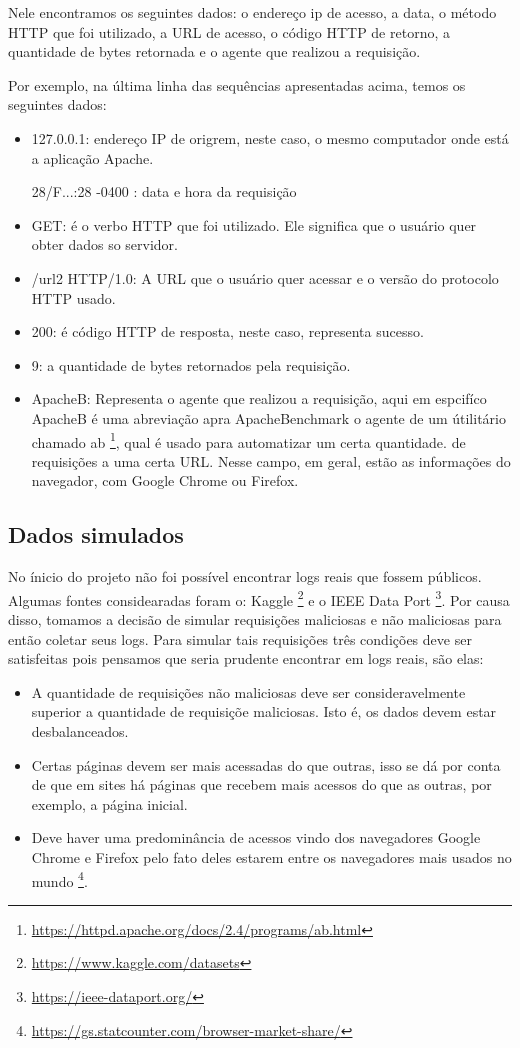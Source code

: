 Nele encontramos os seguintes dados: o endereço ip de acesso, a data, o método HTTP que foi utilizado, 
a URL de acesso, o código HTTP de retorno, a quantidade de bytes retornada e o agente que realizou a requisição.

Por exemplo, na última linha das sequências apresentadas acima, temos os seguintes dados:

\begin{itemize}
    \item 127.0.0.1: endereço IP de origrem, neste caso, o mesmo computador onde está a aplicação Apache.
    \item [28/F...:28 -0400]: data e hora da requisição
    \item GET: é o verbo HTTP que foi utilizado. Ele significa que o usuário quer obter dados so servidor.
    \item /url2 HTTP/1.0: A URL que o usuário quer acessar e o versão do protocolo HTTP usado.
    \item 200: é código HTTP de resposta, neste caso, representa sucesso.
    \item 9: a quantidade de bytes retornados pela requisição. 
    \item ApacheB: Representa o agente que realizou a requisição, aqui em espcifíco ApacheB é uma
    abreviação apra ApacheBenchmark o agente de um útilitário chamado ab \footnote{\url{https://httpd.apache.org/docs/2.4/programs/ab.html}}, 
    qual é usado para automatizar um certa quantidade. de requisições a uma certa URL.
    Nesse campo, em geral, estão as informações do navegador, com Google Chrome ou Firefox.
\end{itemize}


\subsection{Dados simulados}

No ínicio do projeto não foi possível encontrar logs reais que fossem públicos. Algumas fontes
considearadas foram o: Kaggle \footnote{\url{https://www.kaggle.com/datasets}} e o IEEE Data Port 
\footnote{\url{https://ieee-dataport.org/}}. Por causa disso, tomamos a decisão de simular requisições maliciosas 
e não maliciosas para então coletar seus logs. Para simular tais requisições três condições deve 
ser satisfeitas pois pensamos que seria prudente encontrar em logs reais, são elas:

\begin{itemize}
    \item A quantidade de requisições não maliciosas deve ser consideravelmente
    superior a quantidade de requisiçõe maliciosas. Isto é, os dados devem estar desbalanceados.
    \item Certas páginas devem ser mais acessadas do que outras, isso se dá por conta 
    de que em sites há páginas que recebem mais acessos do que as outras, por exemplo, a página inicial.
    \item Deve haver uma predominância de acessos vindo dos navegadores Google Chrome e Firefox pelo fato 
    deles estarem entre os navegadores mais usados no mundo \footnote{\url{https://gs.statcounter.com/browser-market-share/}}.
\end{itemize}

